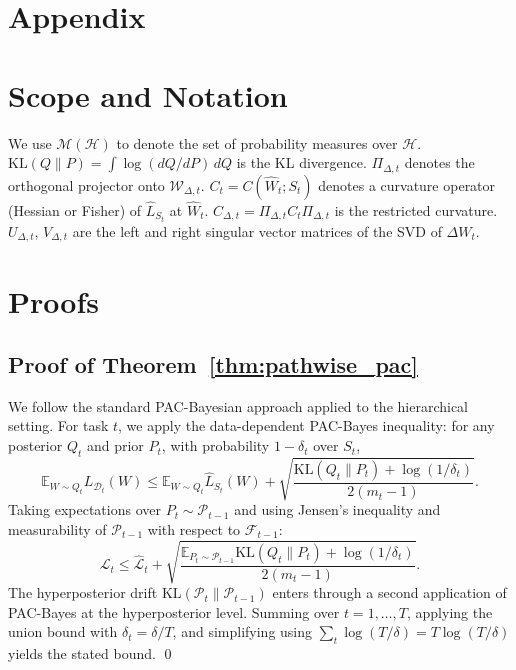 \section*{Appendix}

\section{Scope and Notation}
\label{app:notation}

We use $\mathcal{M}(\mathcal{H})$ to denote the set of probability measures over $\mathcal{H}$.
$\mathrm{KL}(Q \| P) = \int \log(dQ/dP)\,dQ$ is the KL divergence.
$\Pi_{\Delta,t}$ denotes the orthogonal projector onto $\mathcal{W}_{\Delta,t}$.
$C_t = C(\hat{W}_t; S_t)$ denotes a curvature operator (Hessian or Fisher) of $\hat{L}_{S_t}$ at $\hat{W}_t$.
$C_{\Delta,t} = \Pi_{\Delta,t} C_t \Pi_{\Delta,t}$ is the restricted curvature.
$U_{\Delta,t}$, $V_{\Delta,t}$ are the left and right singular vector matrices of the SVD of $\Delta W_t$.

\section{Proofs}
\label{app:proofs}

\subsection{Proof of Theorem~\ref{thm:pathwise_pac}}
\label{proof:theorem all}

We follow the standard PAC-Bayesian approach applied to the hierarchical setting.
For task $t$, we apply the data-dependent PAC-Bayes inequality: for any posterior $Q_t$ and prior $P_t$, with probability $1-\delta_t$ over $S_t$,
\[
\mathbb{E}_{W \sim Q_t} L_{\mathcal{D}_t}(W) \leq \mathbb{E}_{W \sim Q_t} \hat{L}_{S_t}(W) + \sqrt{\frac{\mathrm{KL}(Q_t \| P_t) + \log(1/\delta_t)}{2(m_t - 1)}}.
\]
Taking expectations over $P_t \sim \mathcal{P}_{t-1}$ and using Jensen's inequality and measurability of $\mathcal{P}_{t-1}$ with respect to $\mathcal{F}_{t-1}$:
\[
\mathcal{L}_t \leq \hat{\mathcal{L}}_t + \sqrt{\frac{\mathbb{E}_{P_t \sim \mathcal{P}_{t-1}}\mathrm{KL}(Q_t \| P_t) + \log(1/\delta_t)}{2(m_t-1)}}.
\]
The hyperposterior drift $\mathrm{KL}(\mathcal{P}_t \| \mathcal{P}_{t-1})$ enters through a second application of PAC-Bayes at the hyperposterior level.
Summing over $t = 1, \ldots, T$, applying the union bound with $\delta_t = \delta/T$, and simplifying using $\sum_t \log(T/\delta) = T\log(T/\delta)$ yields the stated bound.
\qed

